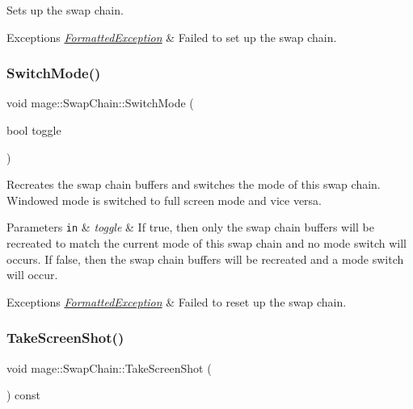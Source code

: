 Sets up the swap chain.


\begin{DoxyExceptions}{Exceptions}
{\em \hyperlink{classmage_1_1_formatted_exception}{Formatted\+Exception}} & Failed to set up the swap chain. \\
\hline
\end{DoxyExceptions}
\hypertarget{classmage_1_1_swap_chain_ada1b8857eeac3d00287fb624645e365e}{}\label{classmage_1_1_swap_chain_ada1b8857eeac3d00287fb624645e365e} 
\subsubsection{\texorpdfstring{Switch\+Mode()}{SwitchMode()}}
{\footnotesize\ttfamily void mage\+::\+Swap\+Chain\+::\+Switch\+Mode (\begin{DoxyParamCaption}\item[{bool}]{toggle }\end{DoxyParamCaption})}

Recreates the swap chain buffers and switches the mode of this swap chain. Windowed mode is switched to full screen mode and vice versa.


\begin{DoxyParams}[1]{Parameters}
\mbox{\tt in}  & {\em toggle} & If {\ttfamily true}, then only the swap chain buffers will be recreated to match the current mode of this swap chain and no mode switch will occurs. If {\ttfamily false}, then the swap chain buffers will be recreated and a mode switch will occur. \\
\hline
\end{DoxyParams}

\begin{DoxyExceptions}{Exceptions}
{\em \hyperlink{classmage_1_1_formatted_exception}{Formatted\+Exception}} & Failed to reset up the swap chain. \\
\hline
\end{DoxyExceptions}
\hypertarget{classmage_1_1_swap_chain_a23a4618b5104203c5a5c962696ae3b53}{}\label{classmage_1_1_swap_chain_a23a4618b5104203c5a5c962696ae3b53} 
\subsubsection{\texorpdfstring{Take\+Screen\+Shot()}{TakeScreenShot()}}
{\footnotesize\ttfamily void mage\+::\+Swap\+Chain\+::\+Take\+Screen\+Shot (\begin{DoxyParamCaption}{ }\end{DoxyParamCaption}) const}

